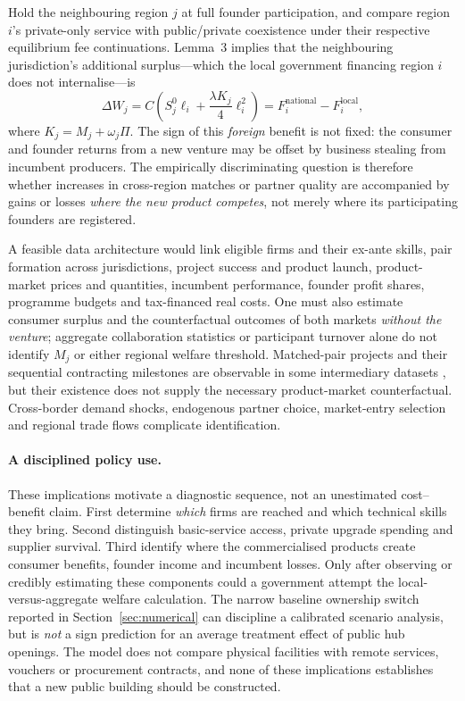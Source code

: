 Hold the neighbouring region $j$ at full founder participation, and compare region $i$'s private-only service with public/private coexistence under their respective equilibrium fee continuations. Lemma~3 implies that the neighbouring jurisdiction's additional surplus---which the local government financing region $i$ does not internalise---is
\begin{equation}
 \Delta W_j=
 C\left(S_j^0\ell_i+\frac{\lambda K_j}{4}\ell_i^2\right)
 =F_i^{\mathrm{national}}-F_i^{\mathrm{local}},
 \label{eq:empirical-spillover}
\end{equation}
where $K_j=M_j+\omega_j\Pi$. The sign of this \emph{foreign} benefit is not fixed: the consumer and founder returns from a new venture may be offset by business stealing from incumbent producers. The empirically discriminating question is therefore whether increases in cross-region matches or partner quality are accompanied by gains or losses \emph{where the new product competes}, not merely where its participating founders are registered.

A feasible data architecture would link eligible firms and their ex-ante skills, pair formation across jurisdictions, project success and product launch, product-market prices and quantities, incumbent performance, founder profit shares, programme budgets and tax-financed real costs. One must also estimate consumer surplus and the counterfactual outcomes of both markets \emph{without the venture}; aggregate collaboration statistics or participant turnover alone do not identify $M_j$ or either regional welfare threshold. Matched-pair projects and their sequential contracting milestones are observable in some intermediary datasets \citep{EldeboHjelm2025}, but their existence does not supply the necessary product-market counterfactual. Cross-border demand shocks, endogenous partner choice, market-entry selection and regional trade flows complicate identification.

\paragraph{A disciplined policy use.}
These implications motivate a diagnostic sequence, not an unestimated cost--benefit claim. First determine \emph{which} firms are reached and which technical skills they bring. Second distinguish basic-service access, private upgrade spending and supplier survival. Third identify where the commercialised products create consumer benefits, founder income and incumbent losses. Only after observing or credibly estimating these components could a government attempt the local-versus-aggregate welfare calculation. The narrow baseline ownership switch reported in Section~\ref{sec:numerical} can discipline a calibrated scenario analysis, but is \emph{not} a sign prediction for an average treatment effect of public hub openings. The model does not compare physical facilities with remote services, vouchers or procurement contracts, and none of these implications establishes that a new public building should be constructed.
